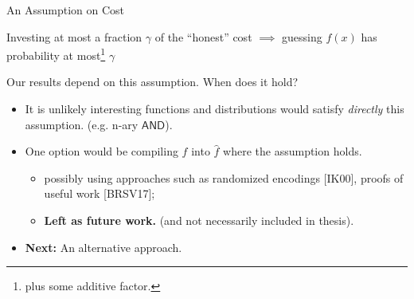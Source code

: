 \begin{frame}{An Assumption on Cost}
		\begin{block}{}
		Investing at most a fraction $\gamma$ of the ``honest'' cost $\implies$ guessing $f(x)$ has probability at most\footnote<1->{plus some additive factor.} $\gamma$ 
	\end{block}
	
	\onslide<+->
	\begin{block}{Our results depend on this assumption. When does it hold?}
	\end{block}
	\onslide<+->
	\begin{itemize}[<+- | alert@+>]	
		\item It is unlikely interesting functions and distributions would satisfy \textit{directly} this assumption. (e.g. n-ary $\mathsf{AND}$).
		\item One option would be compiling $f$ into $\hat{f}$ where the assumption holds.
		\begin{itemize}
			\item possibly using approaches such as randomized encodings [IK00], proofs of useful work [BRSV17];
			\item \textbf{Left as future work.} (and not necessarily included in thesis).
			
		\end{itemize}
		\item \textbf{Next:} An alternative approach.
	\end{itemize}
	
\end{frame}